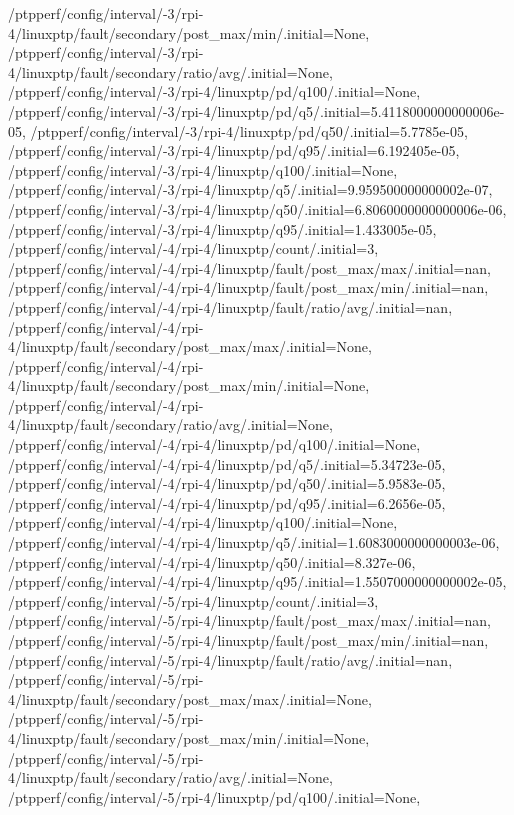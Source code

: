 {    /ptpperf/config/interval/-3/rpi-4/linuxptp/fault/secondary/post_max/min/.initial=None,
    /ptpperf/config/interval/-3/rpi-4/linuxptp/fault/secondary/ratio/avg/.initial=None,
    /ptpperf/config/interval/-3/rpi-4/linuxptp/pd/q100/.initial=None,
    /ptpperf/config/interval/-3/rpi-4/linuxptp/pd/q5/.initial=5.4118000000000006e-05,
    /ptpperf/config/interval/-3/rpi-4/linuxptp/pd/q50/.initial=5.7785e-05,
    /ptpperf/config/interval/-3/rpi-4/linuxptp/pd/q95/.initial=6.192405e-05,
    /ptpperf/config/interval/-3/rpi-4/linuxptp/q100/.initial=None,
    /ptpperf/config/interval/-3/rpi-4/linuxptp/q5/.initial=9.959500000000002e-07,
    /ptpperf/config/interval/-3/rpi-4/linuxptp/q50/.initial=6.8060000000000006e-06,
    /ptpperf/config/interval/-3/rpi-4/linuxptp/q95/.initial=1.433005e-05,
    /ptpperf/config/interval/-4/rpi-4/linuxptp/count/.initial=3,
    /ptpperf/config/interval/-4/rpi-4/linuxptp/fault/post_max/max/.initial=nan,
    /ptpperf/config/interval/-4/rpi-4/linuxptp/fault/post_max/min/.initial=nan,
    /ptpperf/config/interval/-4/rpi-4/linuxptp/fault/ratio/avg/.initial=nan,
    /ptpperf/config/interval/-4/rpi-4/linuxptp/fault/secondary/post_max/max/.initial=None,
    /ptpperf/config/interval/-4/rpi-4/linuxptp/fault/secondary/post_max/min/.initial=None,
    /ptpperf/config/interval/-4/rpi-4/linuxptp/fault/secondary/ratio/avg/.initial=None,
    /ptpperf/config/interval/-4/rpi-4/linuxptp/pd/q100/.initial=None,
    /ptpperf/config/interval/-4/rpi-4/linuxptp/pd/q5/.initial=5.34723e-05,
    /ptpperf/config/interval/-4/rpi-4/linuxptp/pd/q50/.initial=5.9583e-05,
    /ptpperf/config/interval/-4/rpi-4/linuxptp/pd/q95/.initial=6.2656e-05,
    /ptpperf/config/interval/-4/rpi-4/linuxptp/q100/.initial=None,
    /ptpperf/config/interval/-4/rpi-4/linuxptp/q5/.initial=1.6083000000000003e-06,
    /ptpperf/config/interval/-4/rpi-4/linuxptp/q50/.initial=8.327e-06,
    /ptpperf/config/interval/-4/rpi-4/linuxptp/q95/.initial=1.5507000000000002e-05,
    /ptpperf/config/interval/-5/rpi-4/linuxptp/count/.initial=3,
    /ptpperf/config/interval/-5/rpi-4/linuxptp/fault/post_max/max/.initial=nan,
    /ptpperf/config/interval/-5/rpi-4/linuxptp/fault/post_max/min/.initial=nan,
    /ptpperf/config/interval/-5/rpi-4/linuxptp/fault/ratio/avg/.initial=nan,
    /ptpperf/config/interval/-5/rpi-4/linuxptp/fault/secondary/post_max/max/.initial=None,
    /ptpperf/config/interval/-5/rpi-4/linuxptp/fault/secondary/post_max/min/.initial=None,
    /ptpperf/config/interval/-5/rpi-4/linuxptp/fault/secondary/ratio/avg/.initial=None,
    /ptpperf/config/interval/-5/rpi-4/linuxptp/pd/q100/.initial=None,
}
